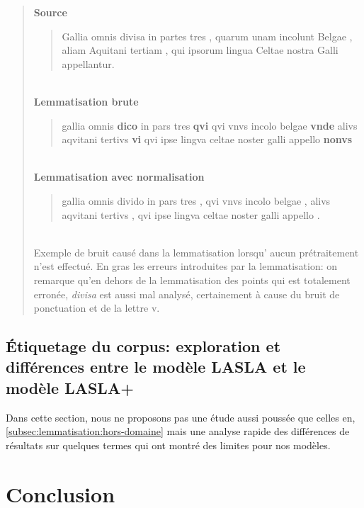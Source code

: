 \begin{quote}
    \textbf{Source}\\
    \blockquote{Gallia omnis divisa in partes tres , quarum unam incolunt Belgae , aliam Aquitani tertiam , qui ipsorum lingua Celtae nostra Galli appellantur.}\\
    \textbf{Lemmatisation brute}\\
    \blockquote{gallia omnis \textbf{dico} in pars tres \textbf{qvi} qvi vnvs incolo belgae \textbf{vnde} alivs aqvitani tertivs \textbf{vi} qvi ipse lingva celtae noster galli appello \textbf{nonvs}}\\
    \textbf{Lemmatisation avec normalisation}\\
    \blockquote{gallia omnis divido in pars tres , qvi vnvs incolo belgae , alivs aqvitani tertivs , qvi ipse lingva celtae noster galli appello .}\\
    
    Exemple de bruit causé dans la lemmatisation lorsqu’ aucun prétraitement n'est effectué. En gras les erreurs introduites par la lemmatisation: on remarque qu'en dehors de la lemmatisation des points qui est totalement erronée, \textit{divisa} est aussi mal analysé, certainement à cause du bruit de ponctuation et de la lettre v.
    \label{quote:lemmatisation:gallia-errors}
\end{quote}


\subsection{Étiquetage du corpus: exploration et différences entre le modèle LASLA et le modèle LASLA+}
 
Dans cette section, nous ne proposons pas une étude aussi poussée que celles en, \ref{subsec:lemmatisation:hors-domaine} mais une analyse rapide des différences de résultats sur quelques termes qui ont montré des limites pour nos modèles.

\section{Conclusion}

